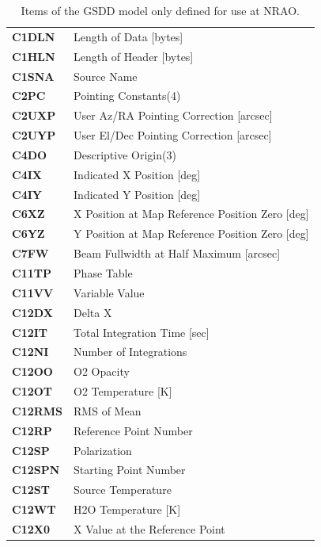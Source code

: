 \documentclass[final,authoryear,5p,times,twocolumn]{elsarticle}
\begin{document}
\begin{table}[t]
\caption{Items of the GSDD model only defined for use at NRAO.}
\label{tab:noaoonly}
\begin{center}
\begin{tabular}{lp{2.5in}}
\hline
\textbf{C1DLN} & Length of Data [bytes]\\
\textbf{C1HLN} & Length of Header [bytes]\\
\textbf{C1SNA} & Source Name\\
\textbf{C2PC} & Pointing Constants(4)\\
\textbf{C2UXP} & User Az/RA Pointing Correction [arcsec]\\
\textbf{C2UYP} & User El/Dec Pointing Correction [arcsec]\\
\textbf{C4DO} & Descriptive Origin(3)\\
\textbf{C4IX} & Indicated X Position [deg]\\
\textbf{C4IY} & Indicated Y Position [deg]\\
\textbf{C6XZ} & X Position at Map Reference Position Zero [deg]\\
\textbf{C6YZ} & Y Position at Map Reference Position Zero [deg]\\
\textbf{C7FW} & Beam Fullwidth at Half Maximum [arcsec]\\
\textbf{C11TP} & Phase Table\\
\textbf{C11VV} & Variable Value\\
\textbf{C12DX} & Delta X\\
\textbf{C12IT} & Total Integration Time [sec]\\
\textbf{C12NI} & Number of Integrations\\
\textbf{C12OO} & O2 Opacity\\
\textbf{C12OT} & O2 Temperature [K]\\
\textbf{C12RMS} & RMS of Mean\\
\textbf{C12RP} & Reference Point Number\\
\textbf{C12SP} & Polarization\\
\textbf{C12SPN} & Starting Point Number\\
\textbf{C12ST} & Source Temperature\\
\textbf{C12WT} & H2O Temperature [K]\\
\textbf{C12X0} & X Value at the Reference Point\\
\hline
\end{tabular}
\end{center}
\end{table}
\end{document}
